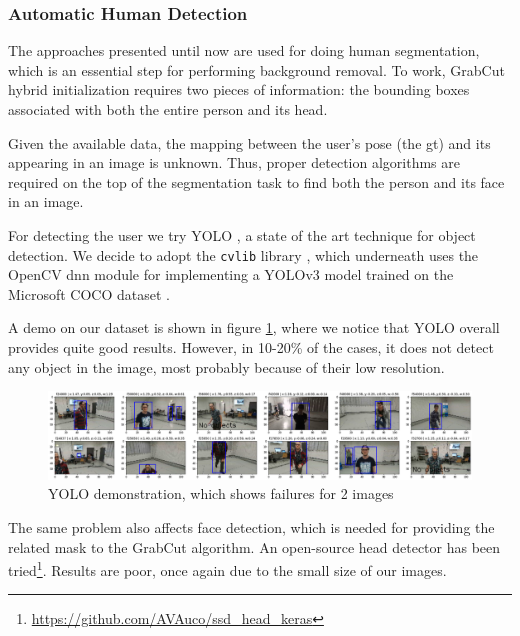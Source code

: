 \subsubsection{Automatic Human Detection}
\label{subsec:masking-yolo}

The approaches presented until now are used for doing human segmentation, which is an essential step for performing background removal. To work, GrabCut hybrid initialization requires two pieces of information: the bounding boxes associated with both the entire person and its head.

Given the available data, the mapping between the user's pose (the \gls{gt}) and its appearing in an image is unknown. Thus, proper detection algorithms are required on the top of the segmentation task to find both the person and its face in an image.

\medskip

For detecting the user we try YOLO \cite{redmon2016look}, a state of the art technique for object detection. We decide to adopt the \texttt{cvlib} library \cite{cvlib}, which underneath uses the OpenCV dnn module \cite{opencv_dnn} for implementing a YOLOv3 model trained on the Microsoft COCO dataset \cite{lin2015microsoft}.

A demo on our dataset is shown in figure \ref{fig:yolo}, where we notice that YOLO overall provides quite good results. However, in 10-20\% of the cases, it does not detect any object in the image, most probably because of their low resolution.

\begin{figure}[!h]
	\centering
	\includegraphics[width=1\textwidth]{"contents/images/04-3yolo"}
	\caption[YOLO demonstration, which shows failures for 2 images]{YOLO demonstration, which shows failures for 2 images}
	\label{fig:yolo}
\end{figure}

The same problem also affects face detection, which is needed for providing the related mask to the GrabCut algorithm. An open-source head detector has been tried\footnote{\url{https://github.com/AVAuco/ssd_head_keras}}. Results are poor, once again due to the small size of our images.

